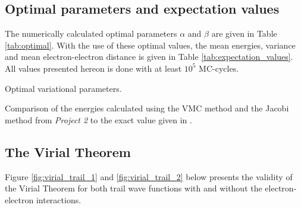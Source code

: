 \documentclass[12pt,english,a4paper]{article}
\begin{document}
\subsection{Optimal parameters and expectation values} \label{section:results:optimal}

The numerically calculated optimal parameters $\alpha$ and $\beta$ are given in Table \ref{tab:optimal}. With the use of these optimal values, the mean energies, variance and mean electron-electron distance is given in Table \ref{tab:expectation_values}. All values presented hereon is done with at least $10^5$ MC-cycles.

\begin{table}[htb]
    \centering
        \caption{Optimal variational parameters.}
        \label{tab:optimal}
\end{table}

\begin{table}[htb]
    \centering
        \caption{Comparison of the energies calculated using the VMC method and the Jacobi method from \textit{Project 2} to the exact value given in \cite{proj5}.}
        \label{tab:comparing}
\end{table}

\newpage

\subsection{The Virial Theorem} \label{section:results:virial}

Figure \ref{fig:virial_trail_1} and \ref{fig:virial_trail_2} below presents the validity of the Virial Theorem for both trail wave functions with and without the electron-electron interactions.
\end{document}
